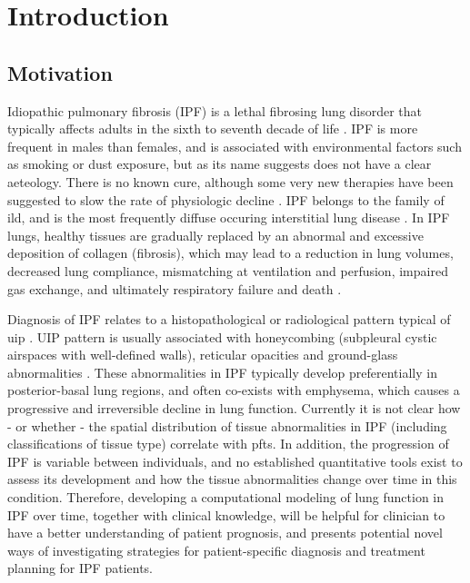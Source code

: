 \chapter{Introduction} \label{Yuwen_Introduction}
\section{Motivation}
Idiopathic pulmonary fibrosis (IPF) is a lethal fibrosing lung disorder that typically affects adults in the sixth to seventh decade of life \citep{meltzer2008idiopathic,king2011idiopathic}. IPF is more frequent in males than females, and is associated with environmental factors such as smoking or dust exposure, but as its name suggests does not have a clear aeteology. There is no known cure, although some very new therapies have been suggested to slow the rate of physiologic decline \citep{raghu2011official}. IPF belongs to the family of \gls{ild}, and is the most frequently diffuse occuring interstitial lung disease \citep{meltzer2008idiopathic}. In IPF lungs, healthy tissues are gradually replaced by an abnormal and excessive deposition of collagen (fibrosis), which may lead to a reduction in lung volumes, decreased lung compliance, mismatching at ventilation and perfusion, impaired gas exchange, and ultimately respiratory failure and death \citep{richeldi2017idiopathic}.

Diagnosis of IPF relates to a histopathological or radiological pattern typical of \gls{uip} \citep{raghu2011official,xaubet2017idiopathic}. UIP pattern is usually associated with honeycombing (subpleural cystic airspaces with well-defined walls),  reticular opacities and ground-glass abnormalities \citep{raghu2011official,richeldi2017idiopathic}. These abnormalities in IPF typically develop preferentially in posterior-basal lung regions, and often co-exists with emphysema, which causes a progressive and irreversible decline in lung function. Currently it is not clear how - or whether - the spatial distribution of tissue abnormalities in IPF (including classifications of tissue type) correlate with \gls{pfts}. In addition, the progression of IPF is variable between individuals, and no established quantitative tools exist to assess its development and how the tissue abnormalities change over time in this condition. Therefore, developing a computational modeling of lung function in IPF over time, together with clinical knowledge, will be helpful for clinician to have a better understanding of patient prognosis, and presents potential novel ways of investigating strategies for patient-specific diagnosis and treatment planning for IPF patients.


